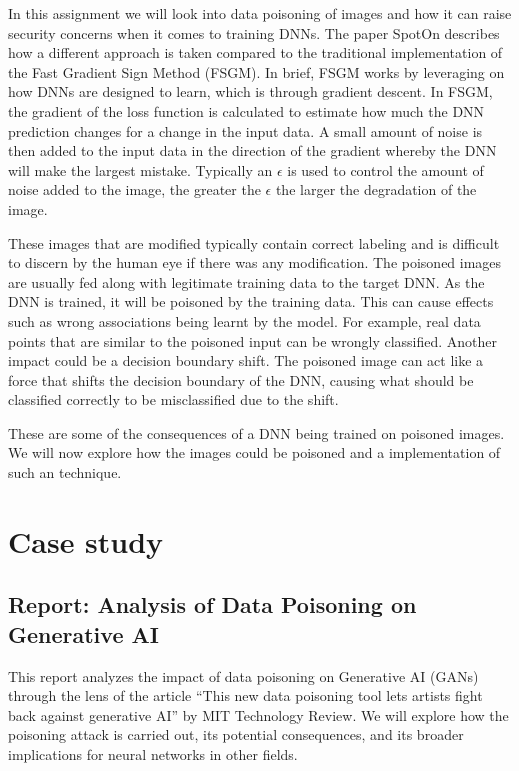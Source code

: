 \documentclass{article}
\begin{document}
In this assignment we will look into data poisoning of images and how it can
raise security concerns when it comes to training DNNs. The paper SpotOn
describes how a different approach is taken compared to the traditional
implementation of the Fast Gradient Sign Method (FSGM). In brief, FSGM works by
leveraging on how DNNs are designed to learn, which is through gradient
descent. In FSGM, the gradient of the loss function is calculated to estimate
how much the DNN prediction changes for a change in the input data. A small
amount of noise is then added to the input data in the direction of the
gradient whereby the DNN will make the largest mistake. Typically an $\epsilon$
is used to control the amount of noise added to the image, the greater the
$\epsilon$ the larger the degradation of the image.

These images that are modified typically contain correct labeling and is
difficult to discern by the human eye if there was any modification. The
poisoned images are usually fed along with legitimate training data to the
target DNN. As the DNN is trained, it will be poisoned by the training data.
This can cause effects such as wrong associations being learnt by the model.
For example, real data points that are similar to the poisoned input can be
wrongly classified. Another impact could be a decision boundary shift. The
poisoned image can act like a force that shifts the decision boundary of the
DNN, causing what should be classified correctly to be misclassified due to the
shift.

These are some of the consequences of a DNN being trained on poisoned images.
We will now explore how the images could be poisoned and a implementation of
such an technique.

\section{Case study}

\subsection{Report: Analysis of Data Poisoning on Generative AI}

This report analyzes the impact of data poisoning on Generative AI (GANs)
through the lens of the article ``This new data poisoning tool lets artists
fight back against generative AI'' by MIT Technology Review. We will explore
how the poisoning attack is carried out, its potential consequences, and its
broader implications for neural networks in other fields.
\end{document}
